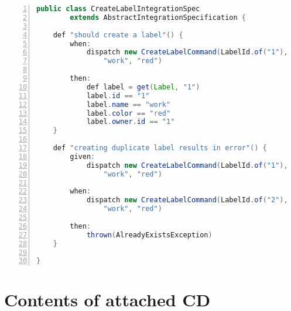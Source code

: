 \documentclass[11pt,twoside,a4paper]{book}
\begin{document}

\begin{lstlisting}[caption={An example of a test specification using Spock.
The first method tests successful creation of a new label.
The second method tests that creating a duplicate label throws an exception.},label={lst:test},
language=java,
numbers=left,
breaklines=true]
public class CreateLabelIntegrationSpec
        extends AbstractIntegrationSpecification {

    def "should create a label"() {
        when:
            dispatch new CreateLabelCommand(LabelId.of("1"),
                "work", "red")

        then:
            def label = get(Label, "1")
            label.id == "1"
            label.name == "work"
            label.color == "red"
            label.owner.id == "1"
    }

    def "creating duplicate label results in error"() {
        given:
            dispatch new CreateLabelCommand(LabelId.of("1"),
                "work", "red")

        when:
            dispatch new CreateLabelCommand(LabelId.of("2"),
                "work", "red")

        then:
            thrown(AlreadyExistsException)
    }

}
\end{lstlisting}



\chapter{Contents of attached CD}

\end{document}
